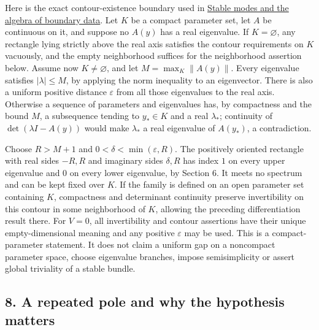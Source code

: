 \documentclass[
  11pt,
]{article}
\begin{document}
Here is the exact contour-existence boundary used in
\href{stable-boundary-models.pdf}{Stable modes and the algebra of
boundary data}. Let \(K\) be a compact parameter set, let \(A\) be
continuous on it, and suppose no \(A(y)\) has a real eigenvalue. If
\(K=\varnothing\), any rectangle lying strictly above the real axis
satisfies the contour requirements on \(K\) vacuously, and the empty
neighborhood suffices for the neighborhood assertion below. Assume now
\(K\ne\varnothing\), and let \(M=\max_K\|A(y)\|\). Every eigenvalue
satisfies \(|\lambda|\leq M\), by applying the norm inequality to an
eigenvector. There is also a uniform positive distance \(\varepsilon\)
from all those eigenvalues to the real axis. Otherwise a sequence of
parameters and eigenvalues has, by compactness and the bound \(M\), a
subsequence tending to \(y_*\in K\) and a real \(\lambda_*\); continuity
of \(\det(\lambda I-A(y))\) would make \(\lambda_*\) a real eigenvalue
of \(A(y_*)\), a contradiction.

Choose \(R>M+1\) and \(0<\delta<\min(\varepsilon,R)\). The positively
oriented rectangle with real sides \(-R,R\) and imaginary sides
\(\delta,R\) has index \(1\) on every upper eigenvalue and \(0\) on
every lower eigenvalue, by Section 6. It meets no spectrum and can be
kept fixed over \(K\). If the family is defined on an open parameter set
containing \(K\), compactness and determinant continuity preserve
invertibility on this contour in some neighborhood of \(K\), allowing
the preceding differentiation result there. For \(V=0\), all
invertibility and contour assertions have their unique empty-dimensional
meaning and any positive \(\varepsilon\) may be used. This is a
compact-parameter statement. It does not claim a uniform gap on a
noncompact parameter space, choose eigenvalue branches, impose
semisimplicity or assert global triviality of a stable bundle.

\subsection{8. A repeated pole and why the hypothesis
matters}\label{a-repeated-pole-and-why-the-hypothesis-matters}
\end{document}
